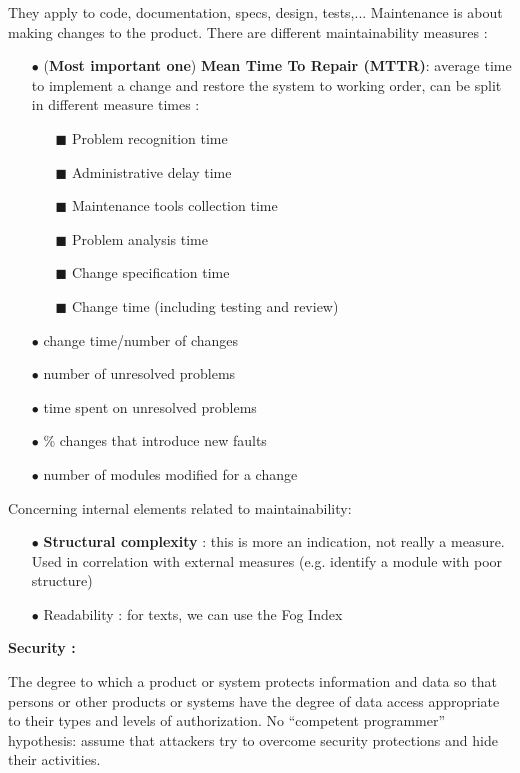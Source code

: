 \documentclass{article}
\begin{document}
\noindent They apply to code, documentation, specs, design, tests,... Maintenance is about making changes to the product. There are different maintainability measures :
\begin{itemize}
    \item[$\bullet$](\textbf{Most important one}) \textbf{Mean Time To Repair (MTTR)}: average time to implement a change and restore the system to working order, can be split in different measure times :
    \begin{itemize}
        \item[$\blacksquare$]Problem recognition time
        \item[$\blacksquare$]Administrative delay time
        \item[$\blacksquare$]Maintenance tools collection time
        \item[$\blacksquare$]Problem analysis time
        \item[$\blacksquare$]Change specification time
        \item[$\blacksquare$]Change time (including testing and review) 
    \end{itemize}
    \item[$\bullet$]change time/number of changes
    \item[$\bullet$]number of unresolved problems
    \item[$\bullet$]time spent on unresolved problems
    \item[$\bullet$]\% changes that introduce new faults
    \item[$\bullet$]number of modules modified for a change \\
\end{itemize}

\noindent Concerning internal elements related to maintainability:
\begin{itemize}
    \item [$\bullet$]\textbf{Structural complexity} : this is more an indication, not really a measure. Used in correlation with external measures (e.g. identify a module with poor structure)
    \item [$\bullet$]Readability : for texts, we can use the Fog Index
\end{itemize}

\newpage
\begin{center}
    \textbf{Security :}
\end{center}
The degree to which a product or system protects information and data so that persons or other products or systems have the degree of data access appropriate to their types and levels of authorization.
No “competent programmer” hypothesis: assume that attackers try to overcome security protections and hide their activities.\\
\end{document}
